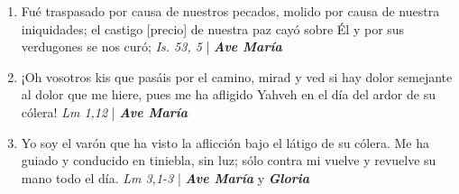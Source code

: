 \documentclass[../../devocionario.tex]{subfiles}
\begin{document}
\begin{enumerate}
        \item Fué traspasado por causa de nuestros pecados, molido por causa de nuestra iniquidades; 
            el castigo [precio] de nuestra paz cayó sobre Él y por sus verdugones se nos curó; \textit{Is. 53, 5} | \textbf{\textit{Ave María}}

        \item ¡Oh vosotros kis que pasáis por el camino, mirad y ved si hay dolor semejante al dolor que me hiere, 
            pues me ha afligido Yahveh en el día del ardor de su cólera! \textit{Lm 1,12} | \textbf{\textit{Ave María}}

        \item Yo soy el varón que ha visto la aflicción bajo el látigo de su cólera. Me ha guiado y conducido en tiniebla, 
            sin luz; sólo contra mi vuelve y revuelve su mano todo el día. \textit{Lm 3,1-3} | \textbf{\textit{Ave María}} y \textbf{\textit{Gloria}}

    \end{enumerate}
\end{document}
